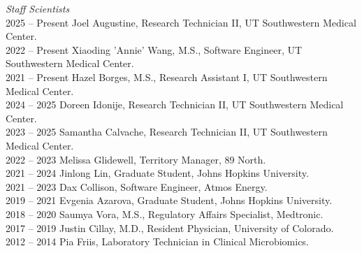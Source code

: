 \textit{Staff Scientists} \\
2025 -- Present \hspace{14pt} Joel Augustine, Research Technician II, UT Southwestern Medical Center. \\
2022 -- Present \hspace{14pt} Xiaoding 'Annie' Wang, M.S., Software Engineer, UT Southwestern Medical Center. \\
2021 -- Present \hspace{14pt} Hazel Borges, M.S., Research Assistant I, UT Southwestern Medical Center. \\
2024 -- 2025 \hspace{28pt} Doreen Idonije, Research Technician II, UT Southwestern Medical Center. \\
2023 -- 2025 \hspace{28pt} Samantha Calvache, Research Technician II, UT Southwestern Medical Center. \\
2022 -- 2023 \hspace{28pt} Melissa Glidewell, Territory Manager, 89 North. \\
2021 -- 2024 \hspace{28pt} Jinlong Lin, Graduate Student, Johns Hopkins University. \\
2021 -- 2023 \hspace{28pt} Dax Collison, Software Engineer, Atmos Energy. \\
2019 -- 2021 \hspace{28pt} Evgenia Azarova, Graduate Student, Johns Hopkins University. \\
2018 -- 2020 \hspace{28pt} Saumya Vora, M.S., Regulatory Affairs Specialist, Medtronic. \\
2017 -- 2019 \hspace{28pt} Justin Cillay, M.D., Resident Physician, University of Colorado. \\
2012 -- 2014 \hspace{28pt} Pia Friis,  Laboratory Technician in Clinical Microbiomics. \\

